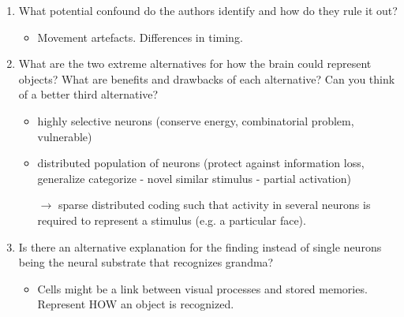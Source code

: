 \documentclass[12pt,english]{scrartcl}
\begin{document}
\begin{enumerate}
  
 \color{black}
 \item What potential confound do the authors identify and how do they rule it out? \\
 \color{blue}
 \begin{itemize}
  \item Movement artefacts. Differences in timing.
 \end{itemize}
 
\color{black}
 \item What are the two extreme alternatives for how the brain could represent objects? What are benefits and drawbacks of each alternative? Can you think of a better third alternative? \\
 \color{blue}
 \begin{itemize}
  \item highly selective neurons (conserve energy, combinatorial problem, vulnerable)
  \item distributed population of neurons (protect against information loss, generalize categorize - novel similar stimulus - partial activation)
 \item[$\rightarrow$] sparse distributed coding such that activity in several neurons is required to represent a stimulus (e.g. a particular face). 
 \end{itemize}
 
\color{black}
 \item Is there an alternative explanation for the finding instead of single neurons being the neural substrate that recognizes grandma?\\
 \color{blue}
 \begin{itemize}
 \item Cells might be a link between visual processes and stored memories. Represent HOW an object is recognized.
 \end{itemize}
\end{enumerate}
\end{document}
